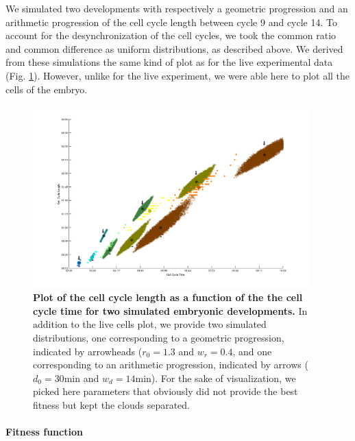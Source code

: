We simulated two developments with respectively a geometric progression and an arithmetic progression of the cell cycle length between cycle 9 and cycle 14. To account for the desynchronization of the cell cycles, we took the common ratio and common difference as uniform distributions, as described above. We derived from these simulations the same kind of plot as for the live experimental data (Fig. \ref{071222bF_t_selection_1_all_T_121224_cellcyclelength_per_generation_MATLAB_simu_arrow}). However, unlike for the live experiment, we were able here to plot all the cells of the embryo.
\begin{figure}
\begin{center}
\includegraphics[width=0.95\textwidth]{../../images/Cases_Studies/Case_1_Division/071222bF_t_selection_1_all_T_121224_cellcyclelength_per_generation_MATLAB_simu_arrow.png}
\end{center}
\caption{\textbf{Plot of the cell cycle length as a function of the the cell cycle time for two simulated embryonic developments.} In addition to the live cells plot, we provide two simulated distributions, one corresponding to a geometric progression, indicated by arrowheads ($r_0 = 1.3$ and $w_r = 0.4$, and one corresponding to an arithmetic progression, indicated by arrows ($d_0 = 30 \mathrm{min}$ and $w_d = 14 \mathrm{min}$). For the sake of visualization, we picked here parameters that obviously did not provide the best fitness but kept the clouds separated.}
\label{071222bF_t_selection_1_all_T_121224_cellcyclelength_per_generation_MATLAB_simu_arrow}
\end{figure}

\paragraph{Fitness function}


